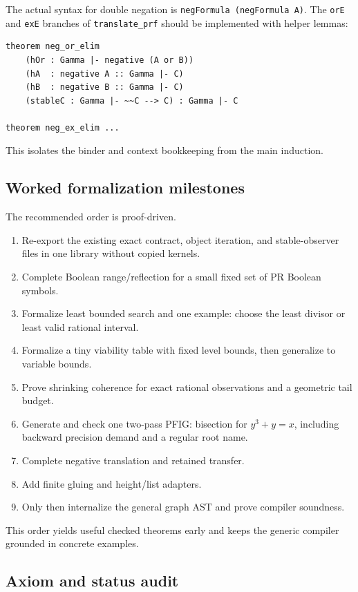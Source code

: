 The actual syntax for double negation is \texttt{negFormula (negFormula A)}.  The \texttt{orE} and \texttt{exE} branches of \texttt{translate\_prf} should be implemented with helper lemmas:

\begin{lstlisting}[language={}]
theorem neg_or_elim
    (hOr : Gamma |- negative (A or B))
    (hA  : negative A :: Gamma |- C)
    (hB  : negative B :: Gamma |- C)
    (stableC : Gamma |- ~~C --> C) : Gamma |- C

theorem neg_ex_elim ...
\end{lstlisting}

This isolates the binder and context bookkeeping from the main induction.

\subsection{Worked formalization milestones}

The recommended order is proof-driven.

\begin{enumerate}
\item Re-export the existing exact contract, object iteration, and stable-observer files in one library without copied kernels.
\item Complete Boolean range/reflection for a small fixed set of PR Boolean symbols.
\item Formalize least bounded search and one example: choose the least divisor or least valid rational interval.
\item Formalize a tiny viability table with fixed level bounds, then generalize to variable bounds.
\item Prove shrinking coherence for exact rational observations and a geometric tail budget.
\item Generate and check one two-pass PFIG: bisection for \(y^3+y=x\), including backward precision demand and a regular root name.
\item Complete negative translation and retained transfer.
\item Add finite gluing and height/list adapters.
\item Only then internalize the general graph AST and prove compiler soundness.
\end{enumerate}

This order yields useful checked theorems early and keeps the generic compiler grounded in concrete examples.

\subsection{Axiom and status audit}

